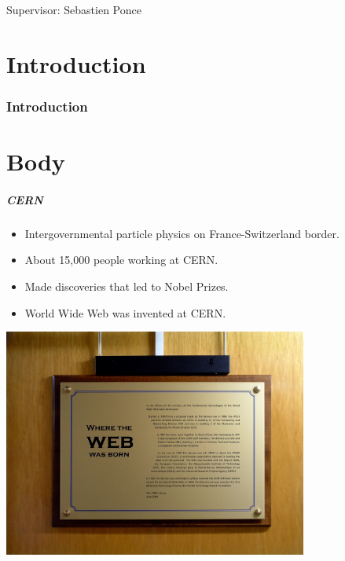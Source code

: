 \documentclass{beamer}
\begin{document}
\begin{frame}
    \maketitle

    Supervisor: Sebastien Ponce
\end{frame}

\part{Introduction}
\section*{Introduction}
\part{Body}

\begin{frame}
    \frametitle{CERN}
    \begin{itemize}
        \item Intergovernmental particle physics on France-Switzerland border.
        \item About  15,000 people working at CERN.
        \item Made discoveries that led to Nobel Prizes.
        \item World Wide Web was invented at CERN.
    \end{itemize}
\end{frame}

\begin{frame}
    \includegraphics[width=0.75\textwidth]{WEB.jpg}
\end{frame}
\end{document}
